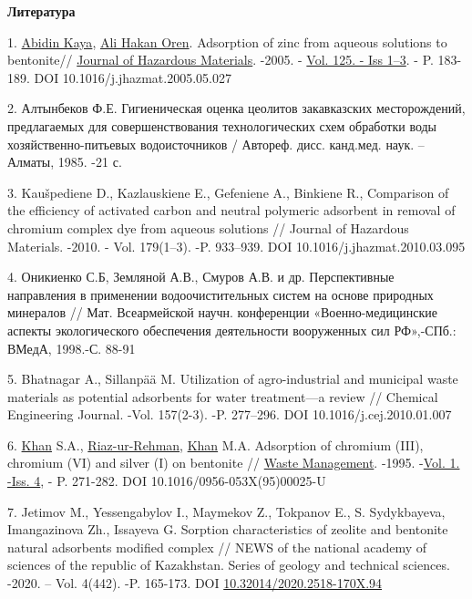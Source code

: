 {\bfseries Литература}

1.
\href{https://www.sciencedirect.com/science/article/abs/pii/S0304389405002669\#!}{Abidin
Kaya},
\href{https://www.sciencedirect.com/science/article/abs/pii/S0304389405002669\#!}{Ali
Hakan Oren}. Adsorption of zinc from aqueous solutions to bentonite//
\href{https://www.sciencedirect.com/science/journal/03043894}{Journal of
Hazardous Materials}. -2005. -
\href{https://www.sciencedirect.com/science/journal/03043894/125/1}{Vol.
125. - Iss 1--3}. - P. 183-189. DOI 10.1016/j.jhazmat.2005.05.027

2. Алтынбеков Ф.Е. Гигиеническая оценка цеолитов закавказских
месторождений, предлагаемых для совершенствования технологических схем
обработки воды хозяйственно-питьевых водоисточников / Автореф. дисс.
канд.мед. наук. -- Алматы, 1985. -21 с.

3. Kaušpediene D., Kazlauskiene E., Gefeniene A., Binkiene R.,
Comparison of the efficiency of activated carbon and neutral polymeric
adsorbent in removal of chromium complex dye from aqueous solutions //
Journal of Hazardous Materials. -2010. - Vol. 179(1--3). -P. 933--939.
DOI 10.1016/j.jhazmat.2010.03.095

4. Оникиенко С.Б, Земляной А.В., Смуров А.В. и др. Перспективные
направления в применении водоочистительных систем на основе природных
минералов // Мат. Всеармейской научн. конфе­ренции «Военно-медицинские
аспекты экологического обеспече­ния деятельности вооруженных сил
РФ»,-СПб.: ВМедА, 1998.-С. 88-91

5. Bhatnagar A., Sillanpää M. Utilization of agro-industrial and
municipal waste materials as potential adsorbents for water
treatment---a review // Chemical Engineering Journal. -Vol. 157(2-3).
-P. 277--296. DOI 10.1016/j.cej.2010.01.007

6.
\href{https://www.sciencedirect.com/science/article/pii/0956053X9500025U\#!}{Khan}
S.A.,
\href{https://www.sciencedirect.com/science/article/pii/0956053X9500025U\#!}{Riaz-ur-Rehman},
\href{https://www.sciencedirect.com/science/article/pii/0956053X9500025U\#!}{Khan}
M.A. Adsorption of chromium (III), chromium (VI) and silver (I) on
bentonite //
\href{https://www.sciencedirect.com/science/journal/0956053X}{Waste
Management}. -1995.
-\href{https://www.sciencedirect.com/science/journal/0956053X/15/4}{Vol.
1. -Iss. 4}, - P. 271-282. DOI 10.1016/0956-053X(95)00025-U

7. Jetimov M., Yessengabylov I., Maymekov Z., Tokpanov E., S.
Sydykbayeva, Imangazinova Zh., Issayeva G. Sorption characteristics of
zeolite and bentonite natural adsorbents modified complex // NEWS of the
national academy of sciences of the republic of Kazakhstan. Series of
geology and technical sciences. -2020. -- Vol. 4(442). -P. 165-173. DOI
\href{http://dx.doi.org/10.32014/2020.2518-170X.94}{10.32014/2020.2518-170X.94}


